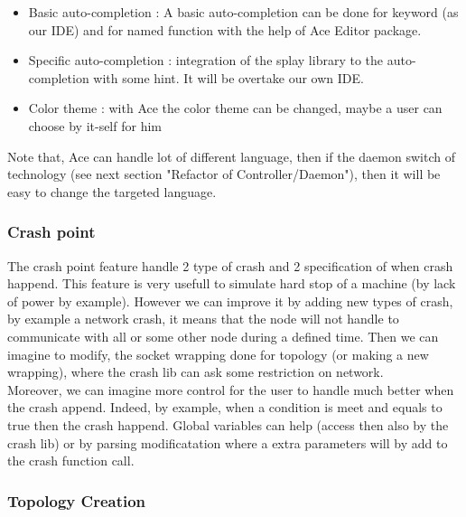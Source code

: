 \documentclass{eplmastersthesis}
\begin{document}
        \begin{itemize}
          \item Basic auto-completion : A basic auto-completion can be done for keyword (as our IDE) and 
          for named function with the help of Ace Editor package. 
          \item Specific auto-completion : integration of the splay library to the auto-completion with some 
          hint. It will be overtake our own IDE.
          \item Color theme : with Ace the color theme can be changed, maybe a user can choose by it-self for him
        \end{itemize}

        Note that, Ace can handle lot of different language, 
        then if the daemon switch of technology (see next section "Refactor of Controller/Daemon"), 
        then it will be easy to change the targeted language.

        \subsubsection{Crash point}

          The crash point feature handle 2 type of crash and 2 specification of when crash happend.
          This feature is very usefull to simulate hard stop of a machine (by lack of power by example).
          However we can improve it by adding new types of crash, by example a network crash, it means
          that the node will not handle to communicate with all or some other node during a defined time.
          Then we can imagine to modify, the socket wrapping done for topology (or making a new wrapping),
          where the crash lib can ask some restriction on network. \\

          Moreover, we can imagine more control for the user to handle much better when the crash append.
          Indeed, by example, when a condition is meet and equals to true then the crash happend. 
          Global variables can help (access then also by the crash lib) or by parsing modificatation
          where a extra parameters will by add to the crash function call.\\          
        
        \subsubsection{Topology Creation}
\end{document}
